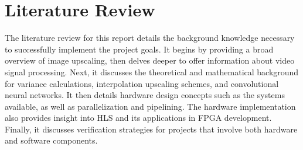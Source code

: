 \documentclass{article}
\begin{document}
\newpage\section{Literature Review}
\label{sec:lit_review} \noindent The literature review for this report details the background knowledge necessary to successfully implement the project goals. It begins by providing a broad overview of image upscaling, then delves deeper to offer information about video signal processing. Next, it discusses the theoretical and mathematical background for variance calculations, interpolation upscaling schemes, and convolutional neural networks. It then details hardware design concepts such as the systems available, as well as parallelization and pipelining. The hardware implementation also provides insight into HLS and its applications in FPGA development. Finally, it discusses verification strategies for projects that involve both hardware and software components. 
   
\end{document}
